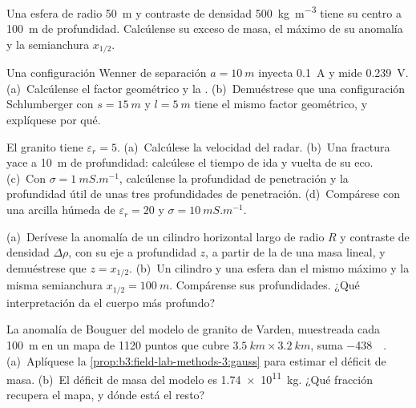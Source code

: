 \begin{exercise}[$\star$]\label{exo:b3:field-lab-methods-3:2}
Una esfera de radio \qty{50}{m} y contraste de densidad
\qty{+500}{kg.m^{-3}} tiene su centro a \qty{100}{m} de profundidad. Calcúlense su
exceso de masa, el máximo de su anomalía y la semianchura $x_{1/2}$.
\end{exercise}

\begin{exercise}[$\star$]\label{exo:b3:field-lab-methods-3:3}
Una configuración Wenner de separación $a = \qty{10}{m}$ inyecta \qty{0.1}{A} y
mide \qty{0.239}{V}. (a)~Calcúlense el factor geométrico y la
. (b)~Demuéstrese que una configuración Schlumberger con $s =
\qty{15}{m}$ y $l = \qty{5}{m}$ tiene el mismo factor geométrico, y
explíquese por qué.
\end{exercise}

\begin{exercise}[$\star$]\label{exo:b3:field-lab-methods-3:4}
El granito tiene $\varepsilon_r = 5$. (a)~Calcúlese la velocidad del radar. (b)~Una
fractura yace a \qty{10}{m} de profundidad: calcúlese el tiempo de ida y vuelta de su eco.
(c)~Con $\sigma = \qty{1}{mS.m^{-1}}$, calcúlense la profundidad de penetración y la
profundidad útil de unas tres profundidades de penetración. (d)~Compárese con una arcilla húmeda de
$\varepsilon_r = 20$ y $\sigma = \qty{10}{mS.m^{-1}}$.
\end{exercise}

\begin{exercise}[$\star\star$]\label{exo:b3:field-lab-methods-3:5}
(a)~Derívese la anomalía de un cilindro horizontal largo de radio $R$ y
contraste de densidad $\Delta\rho$, con su eje a profundidad $z$, a partir de la de una
masa lineal, y demuéstrese que $z = x_{1/2}$. (b)~Un cilindro y una esfera
dan el mismo máximo y la misma semianchura $x_{1/2} = \qty{100}{m}$.
Compárense sus profundidades. ¿Qué interpretación da el cuerpo más profundo?
\end{exercise}

\begin{exercise}[$\star\star$]\label{exo:b3:field-lab-methods-3:6}
La anomalía de Bouguer del modelo de granito de Varden, muestreada cada
\qty{100}{m} en un mapa de \num{1120} puntos que cubre $\qty{3.5}{km}
\times \qty{3.2}{km}$, suma \qty{-438}{\milli\gal}. (a)~Aplíquese la
\cref{prop:b3:field-lab-methods-3:gauss} para estimar el déficit de masa.
(b)~El déficit de masa del modelo es \qty{1.74e11}{kg}. ¿Qué fracción recupera
el mapa, y dónde está el resto?
\end{exercise}

